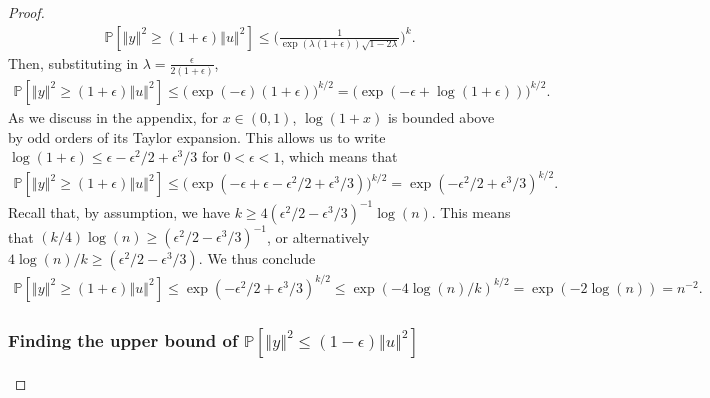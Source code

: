 \documentclass{article}
\begin{document}
\begin{proof}
\begin{align*}
\mathbb{P}\left[ \left\Vert y \right\Vert^2 \geq (1+\epsilon) \left\Vert u \right\Vert^2 \right] \leq \bigg(  \frac{ 1 }{ \exp(\lambda (1+\epsilon)) \sqrt{1-2\lambda} } \bigg)^k.
\end{align*}
Then, substituting in $\lambda = \frac{\epsilon}{2(1+\epsilon)}$,
\begin{align*}
\mathbb{P}\left[ \left\Vert y \right\Vert^2 \geq (1+\epsilon) \left\Vert u \right\Vert^2 \right] \leq \bigg(   \exp(-\epsilon) (1+\epsilon)  \bigg)^{k/2} = \bigg(  \exp(-\epsilon + \log(1+\epsilon) )  \bigg)^{k/2}.
\end{align*}
As we discuss in the appendix, for $x \in (0,1)$, $\log(1+x)$ is bounded above by odd orders of its Taylor expansion. This allows us to write $\log(1+ \epsilon) \leq \epsilon - \epsilon^2/2 + \epsilon^3/3$ for $0 < \epsilon < 1$, which means that
\begin{align*}
\mathbb{P} \left[ \left\Vert y \right\Vert^2 \geq (1+\epsilon) \left\Vert u \right\Vert^2 \right] \leq \bigg( \exp(-\epsilon + \epsilon - \epsilon^2/2 + \epsilon^3/3 )  \bigg)^{k/2} = \exp( - \epsilon^2/2 + \epsilon^3/3 )^{k/2}.
\end{align*}
Recall that, by assumption, we have $k \geq 4(\epsilon^2/2 - \epsilon^3/3)^{-1} \log(n)$. This means that $(k/4)\log(n) \geq (\epsilon^2/2 - \epsilon^3/3)^{-1}$, or alternatively $4\log(n)/k \geq (\epsilon^2/2 - \epsilon^3/3)$. We thus conclude
\begin{align*}
\mathbb{P}\left[ \left\Vert y \right\Vert^2 \geq (1+\epsilon) \left\Vert u \right\Vert^2 \right] \leq \exp( - \epsilon^2/2 + \epsilon^3/3 )^{k/2} \leq \exp( - 4 \log(n) / k )^{k/2} = \exp(-2 \log(n)) = n^{-2}.
\end{align*}
        
\subsubsection{Finding the upper bound of $\mathbb{P} \left[ \left\Vert y \right\Vert^2 \leq (1-\epsilon) \left\Vert u \right\Vert^2 \right]$}


\end{proof}
\end{document}

